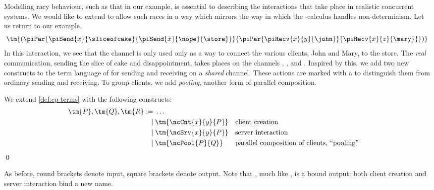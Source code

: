 \documentclass[UKenglish]{llncs}
\begin{document}
Modelling racy behaviour, such as that in our example, is essential
to describing the interactions that take place in realistic concurrent systems.
We would like to extend \cp to allow such races in a way which mirrors the way
in which the \textpi-calculus handles non-determinism.
Let us return to our example.
\[
  \tm{(\piPar{%
      \piSend{x}{\sliceofcake}{\piSend{x}{\nope}{\store}}
    }{%
      \piPar{\piRecv{x}{y}{\john}}{\piRecv{x}{z}{\mary}}
    })}
\]
In this interaction, we see that the channel  is only used only as a way to
connect the various clients, John and Mary, to the store.
The \emph{real} communication, sending the slice of cake and disappointment,
takes places on the channels \tm{\sliceofcake}, \tm{\nope},  and .
Inspired by this, we add two new constructs to the term language of \cp for
sending and receiving on a \emph{shared} channel.
These actions are marked with a \tm{\star} to distinguish them from ordinary
sending and receiving. 
To group clients, we add \emph{pooling}, another form of parallel composition.
\begin{definition}[Terms]\label{def:nc-terms}
  We extend \cref{def:cp-terms} with the following constructs:
  \[\!
    \begin{aligned}
      \tm{P}, \tm{Q}, \tm{R}
           :=& \; \dots
      \\ \mid& \; \tm{\ncCnt{x}{y}{P}} &&\text{client creation}
      \\ \mid& \; \tm{\ncSrv{x}{y}{P}} &&\text{server interaction}
      \\ \mid& \; \tm{\ncPool{P}{Q}}   &&\text{parallel composition of clients, ``pooling''}
    \end{aligned}
  \]
  \qed
\end{definition}
As before, round brackets denote input, square brackets denote output.
Note that , much like , is a bound
output: both client creation and server interaction bind a new name.
\end{document}
